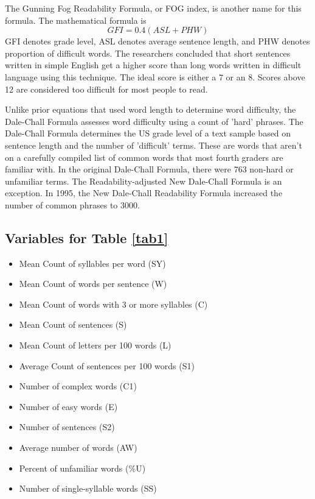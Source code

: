 \documentclass[conference]{IEEEtran}
\begin{document}
\par
The Gunning Fog Readability Formula, or FOG index, is another name for this formula. The mathematical formula is
\begin{equation}
GFI =0.4 (ASL +PHW)\label{eq3}
\end{equation}
GFI denotes grade level, ASL denotes average sentence length, and PHW denotes proportion of difficult words. The researchers concluded that short sentences written in simple English get a higher score than long words written in difficult language using this technique. The ideal score is either a 7 or an 8. Scores above 12 are considered too difficult for most people to read\cite{b13}\cite{b14}.
\par
Unlike prior equations that used word length to determine word difficulty, the Dale-Chall Formula assesses word difficulty using a count of 'hard' phrases. The Dale-Chall Formula \cite{b1} determines the US grade level of a text sample based on sentence length and the number of 'difficult' terms. These are words that aren't on a carefully compiled list of common words that most fourth graders are familiar with. In the original Dale-Chall Formula, there were 763 non-hard or unfamiliar terms. The Readability-adjusted New Dale-Chall Formula is an exception. In 1995, the New Dale-Chall Readability Formula increased the number of common phrases to 3000. \\

\subsection*{Variables for Table \ref{tab1}} \label{var}
\begin{itemize}
\item Mean Count of syllables per word (SY)
\item Mean Count of words per sentence (W)
\item Mean Count of words with 3 or more syllables (C)
\item Mean Count of sentences (S)
\item Mean Count of letters per 100 words (L)
\item Average Count of sentences per 100 words (S1)
\item Number of complex words (C1)
\item Number of easy words (E)
\item Number of sentences (S2)
\item Average number of words (AW)
\item Percent of unfamiliar words (\%U)
\item Number of single-syllable words (SS)
\end{itemize}
\end{document}
